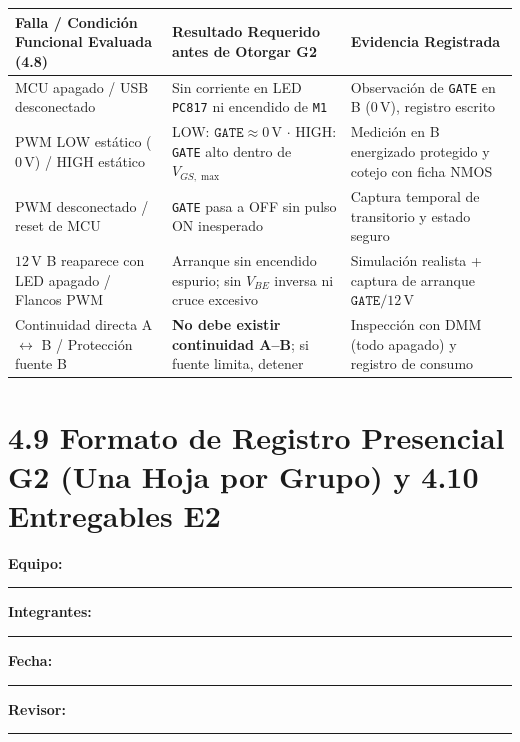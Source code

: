 \documentclass[10pt, a4paper, landscape]{article}
\begin{document}
\par\vspace{0.12cm}\noindent
\renewcommand{\arraystretch}{1.15}
{\footnotesize
\begin{tabularx}{\linewidth}{|>{\raggedright\arraybackslash}p{5.5cm}|>{\raggedright\arraybackslash}p{6.8cm}|>{\raggedright\arraybackslash}X|}
\hline
\rowcolor{ucbgray}
\textbf{Falla / Condición Funcional Evaluada (4.8)} & \textbf{Resultado Requerido antes de Otorgar G2} & \textbf{Evidencia Registrada} \\ \hline
MCU apagado / USB desconectado & Sin corriente en LED \texttt{PC817} ni encendido de \texttt{M1} & Observación de \texttt{GATE} en B ($0\,\text{V}$), registro escrito \\ \hline
PWM LOW estático ($0\,\text{V}$) / HIGH estático & LOW: $\texttt{GATE} \approx 0\,\text{V}$ $\cdot$ HIGH: \texttt{GATE} alto dentro de $V_{GS,\max}$ & Medición en B energizado protegido y cotejo con ficha NMOS \\ \hline
PWM desconectado / reset de MCU & \texttt{GATE} pasa a OFF sin pulso ON inesperado & Captura temporal de transitorio y estado seguro \\ \hline
$12\,\text{V}$ B reaparece con LED apagado / Flancos PWM & Arranque sin encendido espurio; sin $V_{BE}$ inversa ni cruce excesivo & Simulación realista + captura de arranque $\texttt{GATE}/12\,\text{V}$ \\ \hline
Continuidad directa A $\leftrightarrow$ B / Protección fuente B & \textbf{No debe existir continuidad A--B}; si fuente limita, detener & Inspección con DMM (todo apagado) y registro de consumo \\ \hline
\end{tabularx}
}

\section*{4.9 Formato de Registro Presencial G2 (Una Hoja por Grupo) y 4.10 Entregables E2}

\noindent
\textbf{Equipo:} \rule{4.5cm}{0.4pt} \quad \textbf{Integrantes:} \rule{7.5cm}{0.4pt} \quad \textbf{Fecha:} \rule{2.8cm}{0.4pt} \quad \textbf{Revisor:} \rule{4.0cm}{0.4pt}
\end{document}
